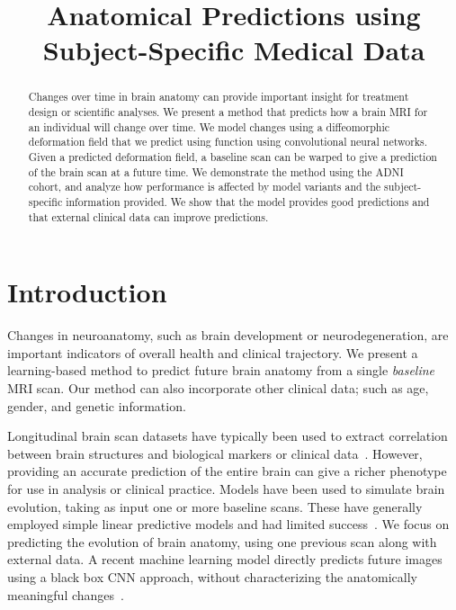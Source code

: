 \documentclass{midl} %
\title[Anatomical Predictions using Subject-Specific Medical Data]{Anatomical Predictions using Subject-Specific Medical Data}
\begin{document}
\abovedisplayskip=0pt
\belowdisplayskip=0pt

\maketitle
\vspace{-1.3cm}
\begin{abstract}
\noindent Changes over time in brain anatomy can provide important insight for treatment design or scientific analyses. We present a method that predicts how a brain MRI for an individual will change over time. We model changes using a diffeomorphic deformation field that we predict using function using convolutional neural networks. Given a predicted deformation field, a baseline scan can be warped to give a prediction of the brain scan at a future time. We demonstrate the method using the ADNI cohort, and analyze how performance is affected by model variants and the subject-specific information provided. We show that the model provides good predictions and that external clinical data can improve predictions. 

\end{abstract}


\vspace{-0.3cm}
\section{Introduction}
\vspace{-0.2cm}

Changes in neuroanatomy, such as brain development or neurodegeneration, are important indicators of overall health and clinical trajectory. We present a learning-based method to predict future brain anatomy from a single \textit{baseline} MRI scan. Our method can also incorporate other clinical data; such as age, gender, and genetic information.

Longitudinal brain scan datasets have typically been used to extract correlation between brain structures and biological markers or clinical data~\cite{biffi2010genetic, potkin2009hippocampal, risacher2010longitudinal, shen2010whole}. However, providing an accurate prediction of the entire brain can give a richer phenotype for use in analysis or clinical practice. Models have been used to simulate brain evolution, taking as input one or more baseline scans. These have generally employed simple linear predictive models and  had limited success~\cite{blanc2012statistical, fleishman2015simultaneous, modat2014simulating, dalca2015predictive}. We focus on predicting the evolution of brain anatomy, using one previous scan along with external data. A recent machine learning model directly predicts future images using a black box CNN approach, without characterizing the anatomically meaningful changes~\cite{ravi2019degenerative}.
\end{document}

